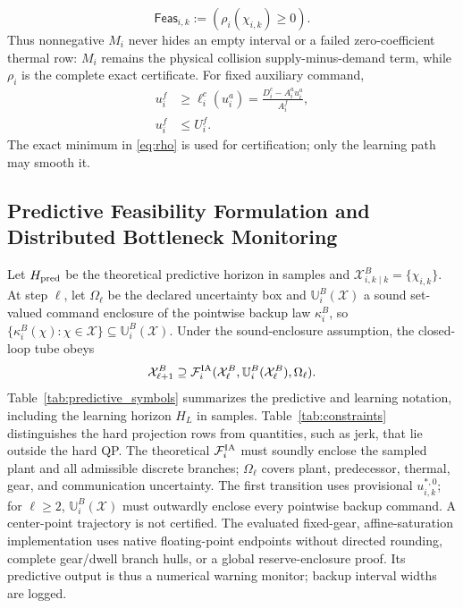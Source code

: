 \begin{equation}\label{eq:instantfeas}
\mathsf{Feas}_{i,k}:=(\rho_i(\chi_{i,k})\ge0).
\end{equation}
Thus nonnegative $M_i$ never hides an empty interval or a failed zero-coefficient thermal row: $M_i$ remains the physical collision supply-minus-demand term, while $\rho_i$ is the complete exact certificate. For fixed auxiliary command,
\begin{align}
u_i^f&\ge\ell_i^c(u_i^a)=\frac{D_i^c-A_i^au_i^a}{A_i^f},\label{eq:lower}\\
u_i^f&\le U_i^f.\label{eq:upper}
\end{align}
The exact minimum in \eqref{eq:rho} is used for certification; only the learning path may smooth it.

\subsection{Predictive Feasibility Formulation and Distributed Bottleneck Monitoring}
Let $H_{\rm pred}$ be the theoretical predictive horizon in samples and $\mathcal X^B_{i,k\mid k}=\{\chi_{i,k}\}$. At step $\ell$, let $\Omega_\ell$ be the declared uncertainty box and $\mathbb U_i^B(\mathcal X)$ a sound set-valued command enclosure of the pointwise backup law $\kappa_i^B$, so $\{\kappa_i^B(\chi):\chi\in\mathcal X\}\subseteq\mathbb U_i^B(\mathcal X)$. Under the sound-enclosure assumption, the closed-loop tube obeys
\begin{equation}\label{eq:tube}
\mathcal X^B_{\ell+1}\supseteq\mathcal F_i^{\rm IA}(\mathcal X^B_\ell,\mathbb U_i^B(\mathcal X^B_\ell),\Omega_\ell).
\end{equation}
Table~\ref{tab:predictive_symbols} summarizes the predictive and learning notation, including the learning horizon $H_L$ in samples. Table~\ref{tab:constraints} distinguishes the hard projection rows from quantities, such as jerk, that lie outside the hard QP.
The theoretical $\mathcal F_i^{\rm IA}$ must soundly enclose the sampled plant and all admissible discrete branches; $\Omega_\ell$ covers plant, predecessor, thermal, gear, and communication uncertainty. The first transition uses provisional $u_{i,k}^{*,0}$; for $\ell\ge2$, $\mathbb U_i^B(\mathcal X)$ must outwardly enclose every pointwise backup command. A center-point trajectory is not certified. The evaluated fixed-gear, affine-saturation implementation uses native floating-point endpoints without directed rounding, complete gear/dwell branch hulls, or a global reserve-enclosure proof. Its predictive output is thus a numerical warning monitor; backup interval widths are logged.

